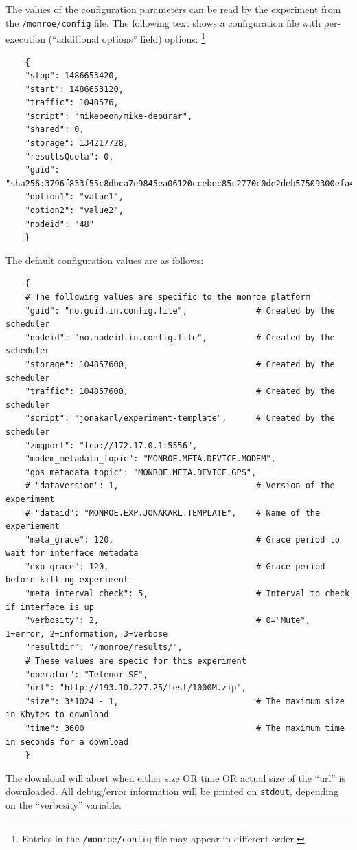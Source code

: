 \documentclass[a4paper,10pt]{article}
\newcommand{\VerbatimFont}{\footnotesize}
\newcommand{\identifier}[1]{{\texttt{\small{#1}}}}
\begin{document}
The values of the configuration parameters can be read by the experiment from the \identifier{/monroe/config} file.
The following text shows a configuration file with %
per-execution (``additional options'' field) options:%
\footnote{Entries in the \identifier{/monroe/config} file may appear in different order.}

{\VerbatimFont
	\begin{verbatim}
	{
	"stop": 1486653420, 
	"start": 1486653120,
	"traffic": 1048576,
	"script": "mikepeon/mike-depurar",
	"shared": 0,
	"storage": 134217728,
	"resultsQuota": 0,
	"guid": "sha256:3796f833f55c8dbca7e9845ea06120ccebec85c2770c0de2deb57509300efa44.165695.48.1",
	"option1": "value1",
	"option2": "value2",
	"nodeid": "48"
	}
	\end{verbatim}}

The default configuration values are as follows:

{\VerbatimFont
	\begin{verbatim}
	{
	# The following values are specific to the monroe platform
	"guid": "no.guid.in.config.file",              # Created by the scheduler
	"nodeid": "no.nodeid.in.config.file",          # Created by the scheduler
	"storage": 104857600,                          # Created by the scheduler
	"traffic": 104857600,                          # Created by the scheduler
	"script": "jonakarl/experiment-template",      # Created by the scheduler
	"zmqport": "tcp://172.17.0.1:5556",
	"modem_metadata_topic": "MONROE.META.DEVICE.MODEM",
	"gps_metadata_topic": "MONROE.META.DEVICE.GPS",
	# "dataversion": 1,                            # Version of the experiment
	# "dataid": "MONROE.EXP.JONAKARL.TEMPLATE",    # Name of the experiement
	"meta_grace": 120,                             # Grace period to wait for interface metadata
	"exp_grace": 120,                              # Grace period before killing experiment
	"meta_interval_check": 5,                      # Interval to check if interface is up
	"verbosity": 2,                                # 0="Mute", 1=error, 2=information, 3=verbose
	"resultdir": "/monroe/results/",
	# These values are specic for this experiment
	"operator": "Telenor SE",
	"url": "http://193.10.227.25/test/1000M.zip",
	"size": 3*1024 - 1,                            # The maximum size in Kbytes to download
	"time": 3600                                   # The maximum time in seconds for a download
	}
	\end{verbatim}}

The download will abort when either size OR time OR actual size of the ``url'' is downloaded.
All debug/error information will be printed on \identifier{stdout}, depending on the ``verbosity'' variable.
\end{document}
